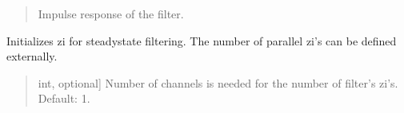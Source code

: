 \documentclass[letterpaper,10pt,english]{sphinxmanual}
\begin{document}
\begin{fulllineitems}
\begin{fulllineitems}
\begin{quote}
\begin{description}
\begin{description}
\end{description}

\begin{description}
\sphinxlineitem{\sphinxstylestrong{ir\_filt}}{[}\sphinxtitleref{np.ndarray}{]}
\sphinxAtStartPar
Impulse response of the filter.

\end{description}

\end{description}\end{quote}

\end{fulllineitems}


\begin{fulllineitems}
\label{\detokenize{classes:dsptools.classes.filter_class.Filter.initialize_zi}}
\pysigstartsignatures
{}
\pysigstopsignatures
\sphinxAtStartPar
Initializes zi for steady\sphinxhyphen{}state filtering. The number of parallel
zi’s can be defined externally.
\begin{quote}\begin{description}
\begin{description}
\sphinxlineitem{\sphinxstylestrong{number\_of\_channels}}{[}int, optional{]}
\sphinxAtStartPar
Number of channels is needed for the number of filter’s zi’s.
Default: 1.

\end{description}

\end{description}\end{quote}

\end{fulllineitems}



\end{fulllineitems}
\end{document}
